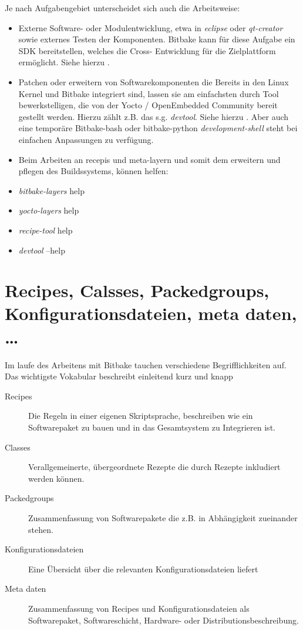 Je nach Aufgabengebiet unterscheidet sich auch die Arbeitsweise:
\begin{itemize}
    \item Externe Software- oder Modulentwicklung, etwa in \textit{eclipse} oder
        \textit{qt-creator} sowie externes Testen der Komponenten. Bitbake kann
        für diese Aufgabe ein \acl{SDK} bereitstellen, welches die Cross-
        Entwicklung für die Ziel\-plattform ermöglicht. Siehe hierzu
        .
    \item Patchen oder erweitern von Software\-komponenten die Bereits in den
        Linux Kernel und Bitbake integriert sind, lassen sie am einfachsten durch
        Tool bewerkstelligen, die von der Yocto / OpenEmbedded Community bereit
        gestellt werden. Hierzu zählt z.B. das s.g. \textit{devtool}. Siehe
        hierzu . Aber auch eine temporäre
        Bitbake-bash oder bitbake-python \textit{development-shell} steht bei
        einfachen Anpassungen zu verfügung.
    \item Beim Arbeiten an recepis und meta-layern und somit dem erweitern und
        pflegen des Buildssystems, können helfen:
            \item \textit{bitbake-layers} help
            \item \textit{yocto-layers } help
            \item \textit{recipe-tool} help
            \item \textit{devtool } --help

\end{itemize}

\section{Recipes, Calsses, Packedgroups, Konfigurationsdateien, meta daten, \ldots}%
\label{sec:recipes_classes_packedgroups}
Im laufe des Arbeitens mit Bitbake tauchen verschiedene Begrifflichkeiten auf.
Das wichtigste  Vokabular beschreibt einleitend kurz und knapp \cite{PhyTec:Yocto_Manual} 

\begin{description}
    \item[Recipes] Die Regeln in einer eigenen Skriptsprache, beschreiben wie
        ein Softwarepaket zu bauen und in das Gesamtsystem zu Integrieren ist.
    \item[Classes] Verallgemeinerte, übergeordnete Rezepte die durch Rezepte
        inkludiert werden können.
    \item[Packedgroups] Zusammenfassung von Softwarepakete die z.B. in
        Abhängigkeit zueinander stehen.
    \item[Konfigurationsdateien] Eine Übersicht über die relevanten
        Konfigurationsdateien liefert
        \cite[Seite 19, 20]{Gonzalez2018:Embedded_Linux_Development_Using_Yocto_Project_Cookbook_2nd}
    \item[Meta daten] Zusammenfassung von Recipes und Konfigurationsdateien als
        Softwarepaket, Softwareschicht, Hardware- oder
        Distributions\-beschreibung.
\end{description}
